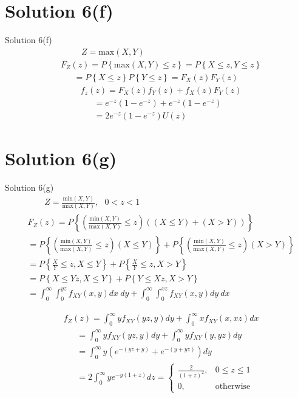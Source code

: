 \documentclass{beamer}
\providecommand{\brak}[1]{\ensuremath{\left(#1\right)}}
\providecommand{\cbrak}[1]{\ensuremath{\left\{#1\right\}}}
\theoremstyle{remark}
\numberwithin{equation}{section}
\numberwithin{figure}{section}
\numberwithin{table}{section}
\begin{document}
\section{Solution 6(f)}
\begin{frame}{Solution 6(f)}
  \begin{align}
    &~~~~~~~~~~~Z = \text{max} \brak{X,Y}\\
    &F_Z\brak{z} = P\cbrak{\text{max}\brak{X,Y}\leq z} = P\cbrak{X\leq z, Y \leq z}\\
    &~~~~~~~=P\cbrak{X \leq z}P\cbrak{Y \leq z}=F_X\brak{z}F_Y\brak{z}
  \end{align}
  \begin{align}
    &f_z\brak{z} = F_X\brak{z}f_Y\brak{z}+f_X\brak{z}F_Y\brak{z}\\
    &~~~~~~~=e^{-z}\brak{1-e^{-z}}+e^{-z}\brak{1-e^{-z}}\\
    &~~~~~~~=2e^{-z}\brak{1-e^{-z}}U\brak{z}
  \end{align}
\end{frame}
\section{Solution 6(g)}
\begin{frame}{Solution 6(g)}
  \begin{align}
    &~~~~~~~~~Z = \frac{\text{min}\brak{X,Y}}{\text{max}\brak{X,Y}}, ~~~ 0<z<1\\
    &F_Z\brak{z} = P\cbrak{\brak{\frac{\text{min}\brak{X,Y}}{\text{max}\brak{X,Y}}\leq z}\brak{\brak{X \leq Y}+\brak{X>Y}}}\\
    &= P\cbrak{\brak{\frac{\text{min}\brak{X,Y}}{\text{max}\brak{X,Y}}\leq z}\brak{X \leq Y}}+P\cbrak{\brak{\frac{\text{min}\brak{X,Y}}{\text{max}\brak{X,Y}}\leq z}\brak{X >Y}}\\
    &=P\cbrak{\frac{X}{Y}\leq z,X\leq Y}+P\cbrak{\frac{X}{Y}\leq z,X > Y}\\
    &=P\cbrak{X\leq Yz,X\leq Y}+P\cbrak{Y\leq Xz,X > Y}\\
    &=\int_0^\infty \int_0^{yz}f_{XY}\brak{x,y}dx~dy+\int_0^\infty \int_0^{xz}f_{XY}\brak{x,y}dy~dx
  \end{align}
\end{frame}
\begin{frame}
  \begin{align}
    &f_Z\brak{z} = \int_0^\infty yf_{XY}\brak{yz,y}dy +\int_0^\infty xf_{XY}\brak{x,xz}dx\\
    &~~~~~~~= \int_0^\infty yf_{XY}\brak{yz,y}dy + \int_0^\infty yf_{XY}\brak{y,yz}dy\\
    &~~~~~~~= \int_0^\infty y\brak{e^{-\brak{yz+y}}+e^{-\brak{y+yz}}}dy\\
    &~~~~~~~= 2\int_0^\infty ye^{-y\brak{1+z}}dz = 
    \begin{cases}
      \frac{2}{{\brak{1+z}}^2}, & 0\leq z \leq 1\\
      0,& \text{otherwise}
    \end{cases}
  \end{align}
\end{frame}
\end{document}
